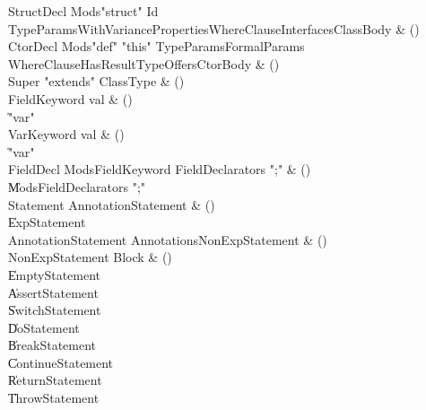 \begin{bbgrammar}
 StructDecl  \label{prod:StructDecl}  \: Mods\opt \xcd"struct" Id TypeParamsWithVariance\opt Properties\opt WhereClause\opt Interfaces\opt ClassBody & ()\\
 CtorDecl  \label{prod:CtorDecl}  \: Mods\opt \xcd"def" \xcd"this" TypeParams\opt FormalParams WhereClause\opt HasResultType\opt Offers\opt CtorBody & ()\\
 Super  \label{prod:Super}  \: \xcd"extends" ClassType & ()\\
 FieldKeyword  \label{prod:FieldKeyword}  \: val & ()\\
    \| \xcd"var"\\
 VarKeyword  \label{prod:VarKeyword}  \: val & ()\\
    \| \xcd"var"\\
 FieldDecl  \label{prod:FieldDecl}  \: Mods\opt FieldKeyword FieldDeclarators \xcd";" & ()\\
    \| Mods\opt FieldDeclarators \xcd";"\\
 Statement  \label{prod:Statement}  \: AnnotationStatement & ()\\
    \| ExpStatement\\
 AnnotationStatement  \label{prod:AnnotationStatement}  \: Annotations\opt NonExpStatement & ()\\
 NonExpStatement  \label{prod:NonExpStatement}  \: Block & ()\\
    \| EmptyStatement\\
    \| AssertStatement\\
    \| SwitchStatement\\
    \| DoStatement\\
    \| BreakStatement\\
    \| ContinueStatement\\
    \| ReturnStatement\\
    \| ThrowStatement\\
\end{bbgrammar}

